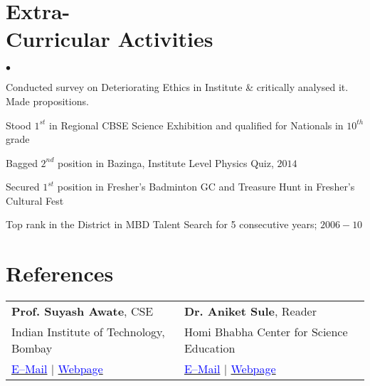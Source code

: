 \documentclass[margin,line]{res}
\newenvironment{list2}{
  \begin{list}{$\bullet$}{%
      \setlength{\itemsep}{0in}
      \setlength{\parsep}{0in} \setlength{\parskip}{0in}
      \setlength{\topsep}{0in} \setlength{\partopsep}{0in} 
      \setlength{\leftmargin}{0.2in}}}{\end{list}}
\begin{document}
\begin{resume}
\section{\sc Extra-\\Curricular Activities} 
\begin{list2}
\item Conducted survey on Deteriorating Ethics in Institute \& critically analysed it. Made propositions.
\item Stood $1^{st}$ in Regional CBSE Science Exhibition and qualified for Nationals in $10^{th}$ grade
\item Bagged $2^{nd}$ position in Bazinga, Institute Level Physics Quiz, $2014$
\item Secured $1^{st}$ position in Fresher's Badminton GC and Treasure Hunt in Fresher's Cultural Fest
\item Top rank in the District in MBD Talent Search for 5 consecutive years; $2006-10$
\end{list2}

\section{\sc References} 
\begin{tabular}{@{}p{3in}p{3in}}
\textbf{Prof. Suyash Awate}, CSE & \textbf{Dr. Aniket Sule}, Reader \\ 
Indian Institute of Technology, Bombay & Homi Bhabha Center for Science Education \\
\href{mailto:suyash@cse.iitb.ac.in}{\textcolor{blue}{E--Mail}} $|$ \href{https://www.cse.iitb.ac.in/~suyash}{\textcolor{blue}{Webpage}} & \href{mailto:anikets@hbcse.tifr.res.in}{\textcolor{blue}{E--Mail}} $|$ \href{http://www.hbcse.tifr.res.in/people/academic/aniket-sule}{\textcolor{blue}{Webpage}}\\
\end{tabular}
\end{resume}
\end{document}
